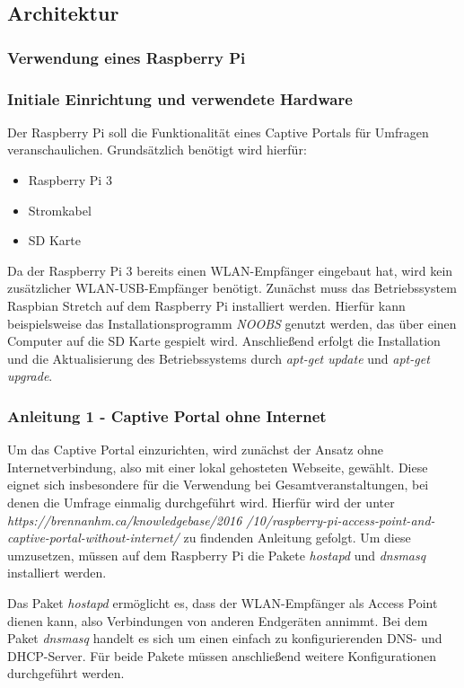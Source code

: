  
\subsection{Architektur}
\subsubsection{Verwendung eines Raspberry Pi}
\subsubsection*{Initiale Einrichtung und verwendete Hardware}
Der Raspberry Pi soll die Funktionalität eines Captive Portals für Umfragen veranschaulichen. Grundsätzlich benötigt wird hierfür:
\begin{itemize}
\item Raspberry Pi 3
\item Stromkabel
\item SD Karte
\end{itemize}

Da der Raspberry Pi 3 bereits einen WLAN-Empfänger eingebaut hat, wird kein zusätzlicher WLAN-USB-Empfänger benötigt. Zunächst muss das Betriebssystem Raspbian Stretch auf dem Raspberry Pi  installiert werden. Hierfür kann beispielsweise das Installationsprogramm \textit{NOOBS} genutzt werden, das über einen Computer auf die SD Karte gespielt wird. Anschließend erfolgt die Installation und die Aktualisierung des Betriebssystems durch \textit{apt-get update} und \textit{apt-get upgrade}.

\subsubsection*{Anleitung 1 - Captive Portal ohne Internet}
Um das Captive Portal einzurichten, wird zunächst der Ansatz ohne Internetverbindung, also mit einer lokal gehosteten Webseite, gewählt. Diese eignet sich insbesondere für die Verwendung bei Gesamtveranstaltungen, bei denen die Umfrage einmalig durchgeführt wird. Hierfür wird der unter \textit{https://brennanhm.ca/knowledgebase/2016 /10/raspberry-pi-access-point-and-captive-portal-without-internet/} zu findenden Anleitung gefolgt. Um diese umzusetzen, müssen auf dem Raspberry Pi die Pakete \textit{hostapd} und \textit{dnsmasq} installiert werden.

Das Paket \textit{hostapd} ermöglicht es, dass der WLAN-Empfänger als Access Point dienen kann, also Verbindungen von anderen Endgeräten annimmt. Bei dem Paket \textit{dnsmasq} handelt es sich um einen einfach zu konfigurierenden DNS- und DHCP-Server. Für beide Pakete müssen anschließend weitere Konfigurationen durchgeführt werden.

